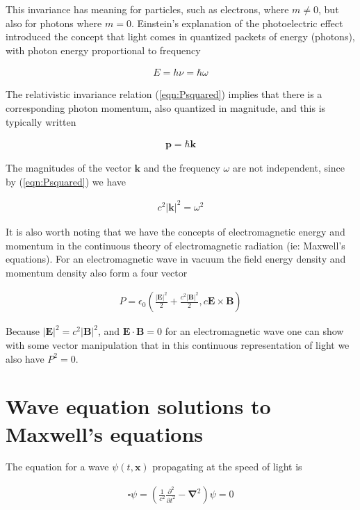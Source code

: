 \documentclass[]{eliblog}
\newcommand{\Abs}[1]{{\left\lvert{#1}\right\rvert}}
\newcommand{\BB}[0]{\mathbf{B}}
\newcommand{\BE}[0]{\mathbf{E}}
\newcommand{\Bk}[0]{\mathbf{k}}
\newcommand{\Bp}[0]{\mathbf{p}}
\newcommand{\Bx}[0]{\mathbf{x}}
\newcommand{\cross}[0]{\times}
\newcommand{\spacegrad}[0]{\boldsymbol{\nabla}}
\newcommand{\delambertian}[0]{\square}
\begin{document}
This invariance has meaning for particles, such as electrons, where $m \ne 0$, but also for photons where $m = 0$.  
Einstein's explanation of the photoelectric effect introduced the concept that light comes in
quantized packets of energy (photons), with photon energy proportional to frequency 

\begin{align}
E = h \nu = \hbar \omega
\end{align}

The relativistic invariance relation (\ref{eqn:Psquared}) implies that there is a corresponding photon momentum, also
quantized in magnitude, and this is typically written

\begin{align}
\Bp = \hbar \Bk
\end{align}

The magnitudes of the vector $\Bk$ and the frequency $\omega$ are not independent, since by (\ref{eqn:Psquared}) we have

\begin{align}\label{eqn:omegaKsquared}
c^2 \Abs{\Bk}^2 = \omega^2
\end{align}

It is also worth noting that we have the concepts of electromagnetic energy and momentum in the continuous theory of
electromagnetic radiation (ie: Maxwell's equations).  For an electromagnetic wave in vacuum the
field energy density and momentum density also form a four vector

\begin{align}
P = \epsilon_0 \left(\frac{\Abs{\BE}^2}{2} + \frac{c^2 \Abs{\BB}^2}{2}, c \BE \cross \BB \right)
\end{align}

Because $\Abs{\BE}^2 = c^2 \Abs{\BB}^2$, and $\BE \cdot \BB = 0$ for an electromagnetic wave one can show with some vector
manipulation that in this continuous representation of light we also have $P^2 = 0$.

\section{Wave equation solutions to Maxwell's equations}

The equation for a wave $\psi(t,\Bx)$ propagating at the speed of light is 

\begin{align}
\delambertian \psi = \left( \frac{1}{c^2}\frac{\partial^2}{{\partial t}^2} - \spacegrad^2 \right) \psi = 0
\end{align}
\end{document}
